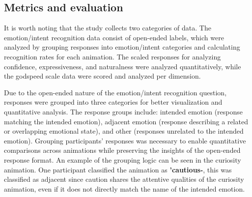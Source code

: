 \subsection{Metrics and evaluation}
It is worth noting that the study collects two categories of data. The emotion/intent recognition data consist of open-ended labels, which were analyzed by grouping responses into emotion/intent categories and calculating recognition rates for each animation. The scaled responses for analyzing confidence, expressiveness, and naturalness were analyzed quantitatively, while the godspeed scale data were scored and analyzed per dimension.

Due to the open-ended nature of the emotion/intent recognition question, responses were grouped into three categories for better visualization and quantitative analysis. The response groups include: intended emotion (response matching the intended emotion), adjacent emotion (response describing a related or overlapping emotional state), and other (responses unrelated to the intended emotion). Grouping participants' responses was necessary to enable quantitative comparisons across animations while preserving the insights of the open-ended response format. 
An example of the grouping logic can be seen in the curiosity animation. One participant classified the animation as \textbf{'cautious-}, this was classified as adjacent since caution shares the attentive qualities of the curiosity animation, even if it does not directly match the name of the intended emotion. 



